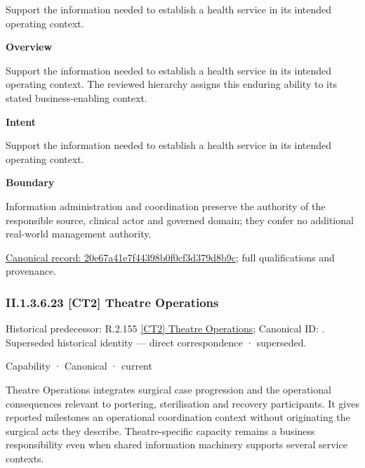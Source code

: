 Support the information needed to establish a health service in its intended operating context.



\textbf{Overview}



Support the information needed to establish a health service in its intended operating context. The reviewed hierarchy assigns this enduring ability to its stated business-enabling context.



\textbf{Intent}



Support the information needed to establish a health service in its intended operating context.



\textbf{Boundary}



Information administration and coordination preserve the authority of the responsible source, clinical actor and governed domain; they confer no additional real-world management authority.


{\footnotesize \href{../../../../continuum/strategy/capability/20e67a41e7f44398b0f0cf3d379d8b9c.md}{Canonical record: 20e67a41e7f44398b0f0cf3d379d8b9c}; full qualifications and provenance.}\par
\subsubsection*{II.1.3.6.23 [CT2] Theatre Operations}
\label{navigation:II.1.3.6.23}

{\small Historical predecessor: R.2.155 \hyperref[element:9ac72fea821c45e2b18632ae9a9867dd]{[CT2] Theatre Operations}; Canonical ID: \texttt{}. Superseded historical identity — direct correspondence · superseded.}\par
\label{element:4bf7a8260e1444fdac44e97c3557b533}
{\small Capability · Canonical · current}\par

Theatre Operations integrates surgical case progression and the operational consequences relevant to portering, sterilisation and recovery participants. It gives reported milestones an operational coordination context without originating the surgical acts they describe. Theatre-specific capacity remains a business responsibility even when shared information machinery supports several service contexts.



